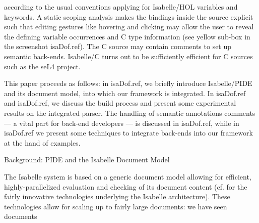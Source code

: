 \begin{isabellebody}
\begin{isamarkuptext}
according to the usual conventions applying for Isabelle/HOL variables and keywords. A static
scoping analysis makes the bindings inside the source explicit such that editing gestures like
hovering and clicking may allow the user to reveal the defining variable occurrences and C type
information (see yellow sub-box in the screenshot \csname isaDof.ref). The C source
may contain comments to set up semantic back-ends. Isabelle/C turns out to be sufficiently efficient
for C sources such as the seL4 project.%
\end{isamarkuptext}\isamarkuptrue%
%
\begin{isamarkuptext}%
This paper proceeds as follows: in \csname isaDof.ref, we
briefly introduce Isabelle/PIDE and its document model, into which our framework is integrated. In
\csname isaDof.ref and
\csname isaDof.ref, we discuss the build process and present some experimental results 
on the integrated parser. The handling of semantic annotations comments --- a vital part for 
back-end developers --- is discussed in \csname isaDof.ref, while in
\csname isaDof.ref we present some techniques to integrate back-ends
into our framework at the hand of examples.%
\end{isamarkuptext}\isamarkuptrue%
%
\begin{isamarkupsection*}%
[label = {background},type = {scholarly_paper.technical}, args={label = {background},type = {scholarly_paper.technical}, Isa_COL.text_element.level = {}, Isa_COL.text_element.referentiable = {False}, Isa_COL.text_element.variants = {{STR ''outline'', STR ''document''}}, scholarly_paper.text_section.main_author = {}, scholarly_paper.text_section.fixme_list = {}, Isa_COL.text_element.level = {}, scholarly_paper.technical.definition_list = {}}]Background: PIDE and the Isabelle Document Model%
\end{isamarkupsection*}\isamarkuptrue%
%
\begin{isamarkuptext}%
\noindent{}The Isabelle system is based on a generic document model allowing for
efficient, highly-parallelized evaluation and checking of its document content (cf. 
\cite{DBLP:conf/itp/Wenzel14,DBLP:journals/corr/Wenzel14,DBLP:conf/mkm/BarrasGHRTWW13}
for the fairly innovative technologies underlying the Isabelle architecture).
These technologies allow for scaling up to fairly large  documents: we have seen documents

\end{isamarkuptext}
\end{isabellebody}

